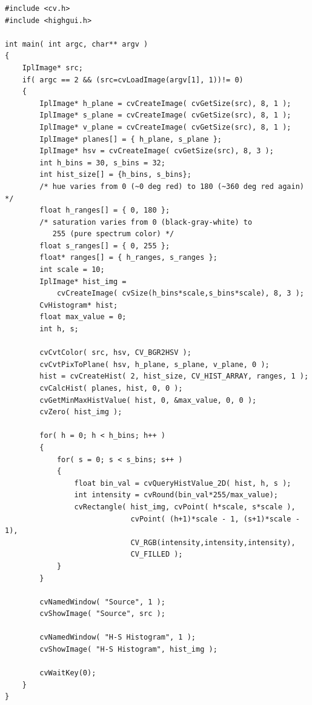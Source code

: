 \begin{lstlisting}
#include <cv.h>
#include <highgui.h>

int main( int argc, char** argv )
{
    IplImage* src;
    if( argc == 2 && (src=cvLoadImage(argv[1], 1))!= 0)
    {
        IplImage* h_plane = cvCreateImage( cvGetSize(src), 8, 1 );
        IplImage* s_plane = cvCreateImage( cvGetSize(src), 8, 1 );
        IplImage* v_plane = cvCreateImage( cvGetSize(src), 8, 1 );
        IplImage* planes[] = { h_plane, s_plane };
        IplImage* hsv = cvCreateImage( cvGetSize(src), 8, 3 );
        int h_bins = 30, s_bins = 32;
        int hist_size[] = {h_bins, s_bins};
        /* hue varies from 0 (~0 deg red) to 180 (~360 deg red again) */
        float h_ranges[] = { 0, 180 };
        /* saturation varies from 0 (black-gray-white) to
           255 (pure spectrum color) */
        float s_ranges[] = { 0, 255 };
        float* ranges[] = { h_ranges, s_ranges };
        int scale = 10;
        IplImage* hist_img =
            cvCreateImage( cvSize(h_bins*scale,s_bins*scale), 8, 3 );
        CvHistogram* hist;
        float max_value = 0;
        int h, s;

        cvCvtColor( src, hsv, CV_BGR2HSV );
        cvCvtPixToPlane( hsv, h_plane, s_plane, v_plane, 0 );
        hist = cvCreateHist( 2, hist_size, CV_HIST_ARRAY, ranges, 1 );
        cvCalcHist( planes, hist, 0, 0 );
        cvGetMinMaxHistValue( hist, 0, &max_value, 0, 0 );
        cvZero( hist_img );

        for( h = 0; h < h_bins; h++ )
        {
            for( s = 0; s < s_bins; s++ )
            {
                float bin_val = cvQueryHistValue_2D( hist, h, s );
                int intensity = cvRound(bin_val*255/max_value);
                cvRectangle( hist_img, cvPoint( h*scale, s*scale ),
                             cvPoint( (h+1)*scale - 1, (s+1)*scale - 1),
                             CV_RGB(intensity,intensity,intensity),
                             CV_FILLED );
            }
        }

        cvNamedWindow( "Source", 1 );
        cvShowImage( "Source", src );

        cvNamedWindow( "H-S Histogram", 1 );
        cvShowImage( "H-S Histogram", hist_img );

        cvWaitKey(0);
    }
}
\end{lstlisting}

\label{CalcBackProject}

